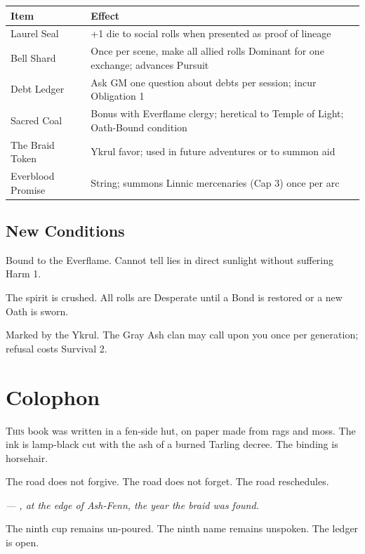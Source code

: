 \documentclass[11pt,a5paper]{book}
\newcommand{\condition}[1]{\textit{#1}}
\begin{document}
\begin{center}
\begin{tabular}{@{}lp{8cm}@{}}
\toprule
\textbf{Item} & \textbf{Effect} \\
\midrule
Laurel Seal & +1 die to social rolls when presented as proof of lineage \\
Bell Shard & Once per scene, make all allied rolls Dominant for one exchange; advances Pursuit \\
Debt Ledger & Ask GM one question about debts per session; incur Obligation 1 \\
Sacred Coal & Bonus with Everflame clergy; heretical to Temple of Light; Oath-Bound condition \\
The Braid Token & Ykrul favor; used in future adventures or to summon aid \\
Everblood Promise & String; summons Linnic mercenaries (Cap 3) once per arc \\
\bottomrule
\end{tabular}
\end{center}

\section*{New Conditions}

\begin{description}[leftmargin=*]
\item[\condition{Oath-Bound}] Bound to the Everflame. Cannot tell lies in direct sunlight without suffering Harm 1.
\item[\condition{Broken}] The spirit is crushed. All rolls are Desperate until a Bond is restored or a new Oath is sworn.
\item[\condition{The Braid}] Marked by the Ykrul. The Gray Ash clan may call upon you once per generation; refusal costs Survival 2.
\end{description}

\clearpage

\chapter*{Colophon}

\lettrine{T}{his} book was written in a fen-side hut, on paper made from rags and moss. The ink is lamp-black cut with the ash of a burned Tarling decree. The binding is horsehair.

The road does not forgive. The road does not forget. The road reschedules.

\vspace{1em}
\noindent \textit{--- \dusana, at the edge of Ash-Fenn, the year the braid was found.}

\vspace{1em}
\noindent The ninth cup remains un-poured. The ninth name remains unspoken. The ledger is open.
\end{document}
